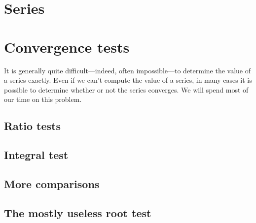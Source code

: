 \documentclass[justified]{tufte-book}
\begin{document}


\chapter{Series}
\label{chapter:series}

 


\chapter{Convergence tests}
\label{chapter:convergence-tests}


It is generally quite difficult---indeed, often impossible---to
determine the value of a series exactly.  Even if we can't compute the
value of a series, in many cases it is possible to determine whether
or not the series converges. We will spend most of our time on this
problem.


\section{Ratio tests}
\label{section:ratio-test}


\section{Integral test}
\label{section:integral-test}


\section{More comparisons}
\label{section:more-comparison-tests}


\section{The mostly useless root test}
\label{section:root-test}

\end{document}
